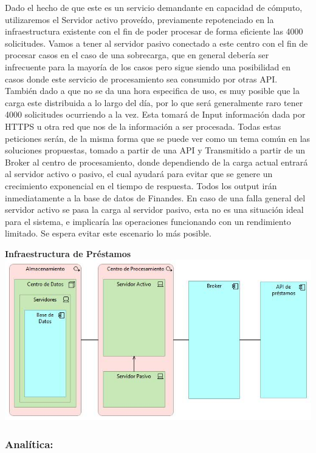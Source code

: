 \documentclass[a4paper]{article}
\begin{document}
Dado el hecho de que este es un servicio demandante en capacidad de cómputo, utilizaremos el 
Servidor activo proveído, previamente repotenciado en la infraestructura existente con el fin de poder 
procesar de forma eficiente las 4000 solicitudes. Vamos a tener al servidor pasivo conectado a este centro
con el fin de procesar casos en el caso de una sobrecarga, que en general debería ser infrecuente para la mayoría
de los casos pero sigue siendo una posibilidad en casos donde este servicio de procesamiento sea consumido por otras
API. También dado a que no se da una hora especifica de uso, es muy posible que la carga este distribuida a lo largo
del día, por lo que será generalmente raro tener 4000 solicitudes ocurriendo a la vez. Esta tomará de Input 
información dada por HTTPS u otra red que nos de la información a ser procesada. Todas estas peticiones serán, de la misma
forma que se puede ver como un tema común en las soluciones propuestas, tomado a partir de una API y  Transmitido a partir de un
Broker al centro de procesamiento, donde dependiendo de la carga actual entrará al servidor activo o pasivo, el cual ayudará
para evitar que se genere un crecimiento exponencial en el tiempo de respuesta. Todos los output irán inmediatamente a la base de datos
de Finandes. En caso de una falla general del servidor activo se pasa la carga al servidor pasivo, esta no es una situación ideal 
para el sistema, e implicaría las operaciones funcionando con un rendimiento limitado. Se espera evitar este escenario 
lo más posible.

\begin{center}
    \textbf{Infraestructura de Préstamos}
    \includegraphics[scale=0.6]{prestamos.jpg}
\end{center}

\subsubsection{Analítica:}
\end{document}

